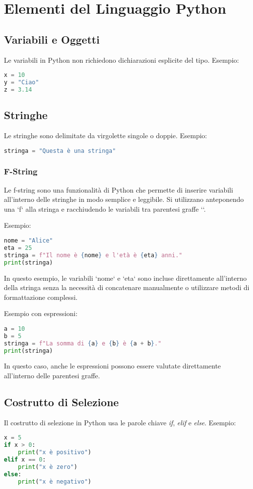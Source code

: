 \section{Elementi del Linguaggio Python}

\subsection{Variabili e Oggetti}
Le variabili in Python non richiedono dichiarazioni esplicite del tipo. Esempio:
\begin{lstlisting}[language=Python]
x = 10
y = "Ciao"
z = 3.14
\end{lstlisting}

\subsection{Stringhe}
Le stringhe sono delimitate da virgolette singole o doppie. Esempio:
\begin{lstlisting}[language=Python]
stringa = "Questa è una stringa"
\end{lstlisting}

\subsubsection{F-String}
Le f-string sono una funzionalità di Python che permette di inserire variabili all'interno delle stringhe in modo semplice e leggibile. Si utilizzano anteponendo una `f` alla stringa e racchiudendo le variabili tra parentesi graffe `{}`.

Esempio:
\begin{lstlisting}[language=Python]
nome = "Alice"
eta = 25
stringa = f"Il nome è {nome} e l'età è {eta} anni."
print(stringa)
\end{lstlisting}

In questo esempio, le variabili `nome` e `eta` sono incluse direttamente all'interno della stringa senza la necessità di concatenare manualmente o utilizzare metodi di formattazione complessi.

Esempio con espressioni:
\begin{lstlisting}[language=Python]
a = 10
b = 5
stringa = f"La somma di {a} e {b} è {a + b}."
print(stringa)
\end{lstlisting}

In questo caso, anche le espressioni possono essere valutate direttamente all'interno delle parentesi graffe.

\subsection{Costrutto di Selezione}
Il costrutto di selezione in Python usa le parole chiave \textit{if}, \textit{elif} e \textit{else}. Esempio:
\begin{lstlisting}[language=Python]
x = 5
if x > 0:
    print("x è positivo")
elif x == 0:
    print("x è zero")
else:
    print("x è negativo")
\end{lstlisting}

